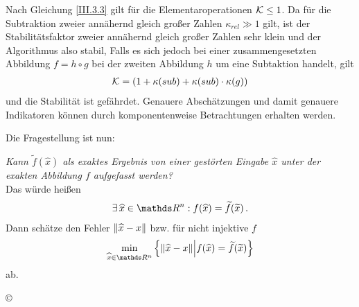 \begin{Bspe}
  Nach Gleichung \eqref{III.3.3} gilt für die Elementaroperationen $\mathcal{K}\leq 1$.
  Da für die Subtraktion zweier annähernd gleich großer Zahlen $\kappa_{rel}\gg 1$ gilt,
  ist der Stabilitätsfaktor zweier annähernd gleich großer
  Zahlen sehr klein und der Algorithmus also stabil,
  Falls es sich jedoch bei einer zusammengesetzten Abbildung $f=h\circ g$
  bei der zweiten Abbildung $h$ um eine Subtaktion handelt, gilt
  \begin{gather*}
    \mathcal{K} =(1+\kappa(sub)+\kappa(sub)\cdot\kappa(g))
  \end{gather*}
  und die Stabilität ist gefährdet.
  Genauere Abschätzungen und damit genauere Indikatoren
  können durch komponentenweise Betrachtungen erhalten werden.
\end{Bspe}


 
Die Fragestellung ist nun:

\textit{Kann $\widetilde{f}(\widehat{x})$ als exaktes Ergebnis von einer gestörten Eingabe $\widehat{x}$ unter der exakten Abbildung $f$ aufgefasst werden?}\\

Das würde heißen
\begin{gather*}
  \exists\, \widehat{x}\in \Ren: f(\widehat{x})= \widetilde{f}(\widetilde{x})\, .
\end{gather*}
Dann schätze den Fehler $ \left\| \widehat{x}-x \right\|$
bzw. für nicht injektive $f$
\begin{gather*}
  \min_{\widehat{x}\in \Ren}
  \left\{
    \nn{\widehat{x}-x} 
    \middle\vert f(\widehat{x}) = \widetilde{f}(\widetilde{x}) 
  \right\}
\end{gather*} 
ab. 

\begin{image}{\copyright}
\end{image}

